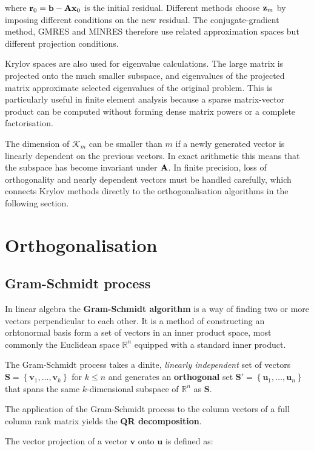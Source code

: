 where $ \mathbf{r}_0=\mathbf{b}-\mathbf{A}\mathbf{x}_0 $ is the initial residual. Different methods
choose $ \mathbf{z}_m $ by imposing different conditions on the new residual. The
conjugate-gradient method, GMRES and MINRES therefore use related approximation
spaces but different projection conditions.

Krylov spaces are also used for eigenvalue calculations. The large matrix is
projected onto the much smaller subspace, and eigenvalues of the projected matrix
approximate selected eigenvalues of the original problem. This is particularly
useful in finite element analysis because a sparse matrix-vector product can be
computed without forming dense matrix powers or a complete factorisation.

The dimension of $ \mathcal{K}_m $ can be smaller than $ m $ if a newly generated
vector is linearly dependent on the previous vectors. In exact arithmetic this
means that the subspace has become invariant under $ \mathbf{A} $. In finite precision,
loss of orthogonality and nearly dependent vectors must be handled carefully,
which connects Krylov methods directly to the orthogonalisation algorithms in the
following section.

\section{Orthogonalisation}
\subsection{Gram-Schmidt process}

In linear algebra the \textbf{Gram-Schmidt algorithm} is a way of finding two
or more vectors perpendicular to each other. It is a method of constructing an
orhtonormal basis form a set of vectors in  an inner product space, most commonly
the Euclidean space $ \mathbb{R}^n $ equipped with a standard inner product.

The Gram-Schmidt process takes a dinite, \textit{linearly independent} set of
vectors $ \mathbf{S} = \left\{ \mathbf{v}_1, \dots, \mathbf{v}_k \right\} $ for $ k \le n $ and
generates an \textbf{orthogonal} set $ \mathbf{S}' = \left\{ \mathbf{u}_1, \dots, \mathbf{u}_n \right\} $
that spans the same $ k $-dimensional subspace of $ \mathbb{R}^n $ as $ \mathbf{S} $.

The application of the Gram-Schmidt process to the column vectors of a full
column rank matrix yields the \textbf{QR decomposition}.

The vector projection of a vector $ \mathbf{v} $ onto $ \mathbf{u} $ is defined as:

